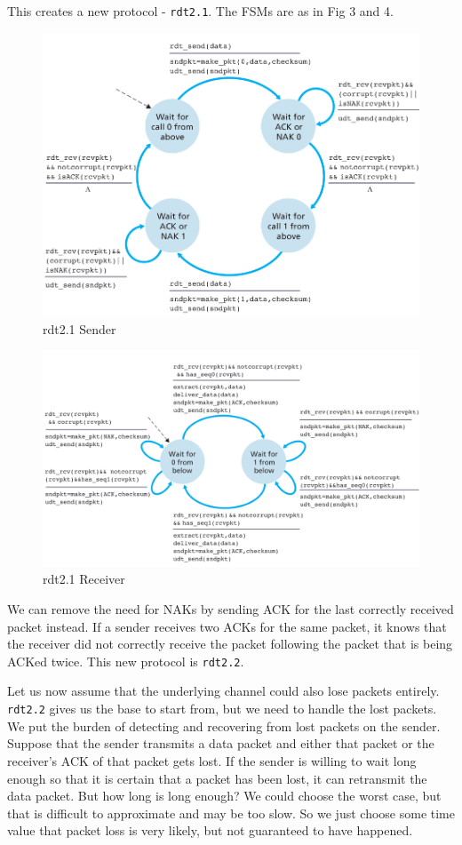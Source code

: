 \documentclass[12pt,letterpaper]{amsbook}
\theoremstyle{definition}
\begin{document}
This creates a new protocol - \texttt{rdt2.1}. The FSMs are as in Fig 3 and 4.

\begin{figure}[htpb]
  \centering
  \includegraphics[width=0.8\linewidth]{./assets/rdt2-1_sender.png}
  \caption{rdt2.1 Sender}%
  \label{fig:name}
\end{figure}

\begin{figure}[htpb]
  \centering
  \includegraphics[width=0.8\linewidth]{./assets/rdt2-1_rcvr.png}
  \caption{rdt2.1 Receiver}%
  \label{fig:./assets}
\end{figure}

We can remove the need for NAKs by sending ACK for the last correctly received packet instead. If a sender receives two ACKs for the same packet, it knows that the receiver did not correctly receive the packet following the packet that is being ACKed twice. This new protocol is \texttt{rdt2.2}.

Let us now assume that the underlying channel could also lose packets entirely. \texttt{rdt2.2} gives us the base to start from, but we need to handle the lost packets. We put the burden of detecting and recovering from lost packets on the sender. Suppose that the sender transmits a data packet and either that packet or the receiver's ACK of that packet gets lost. If the sender is willing to wait long enough so that it is certain that a packet has been lost, it can retransmit the data packet. But how long is long enough? We could choose the worst case, but that is difficult to approximate and may be too slow. So we just choose some time value that packet loss is very likely, but not guaranteed to have happened.
\end{document}
